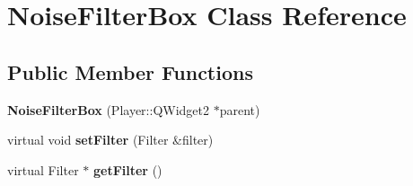 \hypertarget{classNoiseFilterBox}{}\section{Noise\+Filter\+Box Class Reference}
\label{classNoiseFilterBox}
\subsection*{Public Member Functions}
\begin{DoxyCompactItemize}
\item 
\hypertarget{classNoiseFilterBox_afb72bd6c641409c2a054791d51fb10bc}{}{\bfseries Noise\+Filter\+Box} (Player\+::\+Q\+Widget2 $\ast$parent)\label{classNoiseFilterBox_afb72bd6c641409c2a054791d51fb10bc}

\item 
\hypertarget{classNoiseFilterBox_a09e99b0db09b8468ce7d7e0f98293ac5}{}virtual void {\bfseries set\+Filter} (Filter \&filter)\label{classNoiseFilterBox_a09e99b0db09b8468ce7d7e0f98293ac5}

\item 
\hypertarget{classNoiseFilterBox_ad7b14770615490d1445c958c79fd3adb}{}virtual Filter $\ast$ {\bfseries get\+Filter} ()\label{classNoiseFilterBox_ad7b14770615490d1445c958c79fd3adb}

\end{DoxyCompactItemize}
